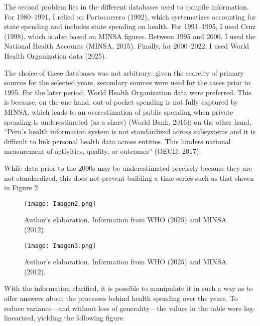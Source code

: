 \documentclass[12pt]{article}
\begin{document}
The second problem lies in the different databases used to compile information. For 1980–1991, I relied on Portocarrero (1992), which systematizes accounting for state spending and includes state spending on health. For 1991–1995, I used Cruz (1998), which is also based on MINSA figures. Between 1995 and 2000, I used the National Health Accounts (MINSA, 2015). Finally, for 2000–2022, I used World Health Organization data (2025).

The choice of these databases was not arbitrary: given the scarcity of primary sources for the selected years, secondary sources were used for the cases prior to 1995. For the later period, World Health Organization data were preferred. This is because, on the one hand, out-of-pocket spending is not fully captured by MINSA, which leads to an overestimation of public spending when private spending is underestimated (as a share) (World Bank, 2016); on the other hand, “Peru’s health information system is not standardized across subsystems and it is difficult to link personal health data across entities. This hinders national measurement of activities, quality, or outcomes” (OECD, 2017).

While data prior to the 2000s may be underestimated precisely because they are not standardized, this does not prevent building a time series such as that shown in Figure 2.

\bigskip


\begin{figure}[H]
\par\vspace{0.8em}
\texttt{[image: Imagen2.png]}

{\footnotesize Author’s elaboration. Information from WHO (2025) and MINSA (2012).}
\end{figure}



\begin{figure}[H]
\par\vspace{0.8em}
\texttt{[image: Imagen3.png]}

{\footnotesize Author’s elaboration. Information from WHO (2025) and MINSA (2012).}
\end{figure}

With the information clarified, it is possible to manipulate it in such a way as to offer answers about the processes behind health spending over the years. To reduce variance—and without loss of generality—the values in the table were log-linearized, yielding the following figure.
\end{document}
